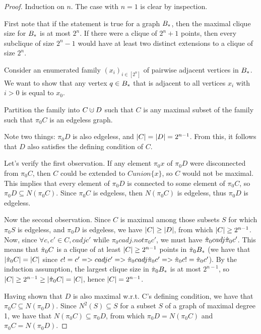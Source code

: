 \documentclass{amsart}
\theoremstyle{definition}
\newcommand{\cupdot}{\mathbin{\mathaccent\cdot\cup}}
\begin{document}
\begin{proof} 

  Induction on $n$. The case with $n=1$ is clear by inspection.

  First note that if the statement is true for a graph $B_*$, then the maximal clique size for $B_*$ is at most $2^n$. If there were a clique of $2^n+1$ points, then every subclique of size $2^n - 1$ would have at least two distinct extensions to a clique of size $2^n$.

  Consider an enumerated family $(x_i)_{i \in [2^n]}$ of pairwise adjacent
  vertices in $B_*$. We want to show that any vertex $q \in B_*$ that is
  adjacent to all vertices $x_i$ with $i > 0$ is equal to $x_0$.

  Partition the family into $C \cupdot D$ such that $C$ is any maximal
  subset of the family such that $\pi_0 C$ is an edgeless graph.

  Note two things: $\pi_0 D$ is also edgeless, and $\abs{C} = \abs{D} = 2^{n-1}$. From this, it follows that $D$ also satisfies the defining condition of $C$.

  Let's verify the first observation. If any element $\pi_0 x$ of $\pi_0 D$ were disconnected from $\pi_0 C$, then $C$ could be extended to $C union \{x\}$, so $C$ would not be maximal. This implies that every element of $\pi_0 D$ is connected to some element of $\pi_0 C$, so $\pi_0 D \subseteq N(\pi_0 C)$. Since $\pi_0 C$ is edgeless, then $N(\pi_0 C)$ is edgeless,
  thus $\pi_0 D$ is edgeless.

  Now the second observation. Since $C$ is maximal among those subsets $S$ for which $\pi_0 S$ is edgeless, and $\pi_0 D$ is edgeless, we have $\abs{C} \geq \abs{D}$, from which $\abs{C} \geq 2^{n-1}$. Now, since $\forall c, c' \in C, c adj c'$ while $\pi_0 c adj.not \pi_0 c'$, we must have $\hat{\pi}_0 c adj \hat{\pi}_0 c'$. This means that $\hat{\pi}_0 C$ is a clique of at least $\abs{C} \geq 2^{n-1}$ points in $\hat{\pi}_0 B_*$ (we have that $\abs{\hat{\pi}_0 C} = \abs{C}$ since $c != c' => c adj c' => \hat{\pi}_0 c adj \hat{\pi}_0 c' => \hat{\pi}_0 c != \hat{\pi}_0 c'$). By the induction assumption, the largest clique size in $\hat{\pi}_0 B_*$ is at most $2^{n-1}$, so $\abs{C} \geq 2^{n-1} \geq \abs{\hat{\pi}_0 C} = \abs{C}$, hence $\abs{C} = 2^{n-1}$.

  Having shown that $D$ is also maximal w.r.t. C's defining condition, we have that $\pi_0 C \subseteq N(\pi_0 D)$. Since $N^2(S) \subseteq S$ for a subset $S$ of a graph of maximal degree 1, we have that $N(\pi_0 C) \subseteq \pi_0 D$, from which $\pi_0 D = N(\pi_0 C)$ and $\pi_0 C = N(\pi_0 D)$.


\end{proof}
\end{document}
